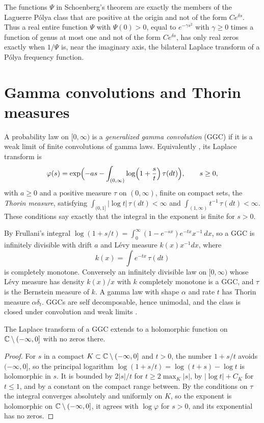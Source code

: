 The functions $\Psi$ in Schoenberg's theorem \cite{schoenberg1951,karlin1968} are exactly the members of the Laguerre P\'olya class that are positive at the origin and not of the form $Ce^{\delta s}$. Thus a real entire function $\Psi$ with $\Psi(0)>0$, equal to $e^{-\gamma s^2}$ with $\gamma\ge0$ times a function of genus at most one and not of the form $Ce^{\delta s}$, has only real zeros exactly when $1/\Psi$ is, near the imaginary axis, the bilateral Laplace transform of a P\'olya frequency function.

\section{Gamma convolutions and Thorin measures}

\begin{definition}\label{def:ch10ggc}
A probability law on $[0,\infty)$ is a \emph{generalized gamma convolution} (GGC) if it is a weak limit of finite convolutions of gamma laws. Equivalently \cite{thorin1977,bondesson1992}, its Laplace transform is
\[
\varphi(s) = \exp\Bigl(-as - \int_{(0,\infty)}\log\Bigl(1+\frac{s}{t}\Bigr)\,\tau(dt)\Bigr),\qquad s\ge0,
\]
with $a\ge0$ and a positive measure $\tau$ on $(0,\infty)$, finite on compact sets, the \emph{Thorin measure}, satisfying $\int_{(0,1]}|\log t|\,\tau(dt)<\infty$ and $\int_{(1,\infty)}t^{-1}\,\tau(dt)<\infty$. These conditions say exactly that the integral in the exponent is finite for $s>0$.
\end{definition}

By Frullani's integral $\log(1+s/t) = \int_0^\infty(1-e^{-sx})e^{-tx}x^{-1}\,dx$, so a GGC is infinitely divisible with drift $a$ and L\'evy measure $k(x)x^{-1}dx$, where
\[
k(x) = \int e^{-tx}\,\tau(dt)
\]
is completely monotone. Conversely an infinitely divisible law on $[0,\infty)$ whose L\'evy measure has density $k(x)/x$ with $k$ completely monotone is a GGC, and $\tau$ is the Bernstein measure of $k$. A gamma law with shape $\alpha$ and rate $t$ has Thorin measure $\alpha\delta_t$. GGCs are self decomposable, hence unimodal, and the class is closed under convolution and weak limits \cite{bondesson1992}.

\begin{lemma}\label{lem:ch10nonvanish}
The Laplace transform of a GGC extends to a holomorphic function on $\mathbb{C}\setminus(-\infty,0]$ with no zeros there.
\end{lemma}

\begin{proof}
For $s$ in a compact $K\subset\mathbb{C}\setminus(-\infty,0]$ and $t>0$, the number $1+s/t$ avoids $(-\infty,0]$, so the principal logarithm $\log(1+s/t) = \log(t+s)-\log t$ is holomorphic in $s$. It is bounded by $2|s|/t$ for $t\ge2\max_K|s|$, by $|\log t|+C_K$ for $t\le1$, and by a constant on the compact range between. By the conditions on $\tau$ the integral converges absolutely and uniformly on $K$, so the exponent is holomorphic on $\mathbb{C}\setminus(-\infty,0]$, it agrees with $\log\varphi$ for $s>0$, and its exponential has no zeros.
\end{proof}


